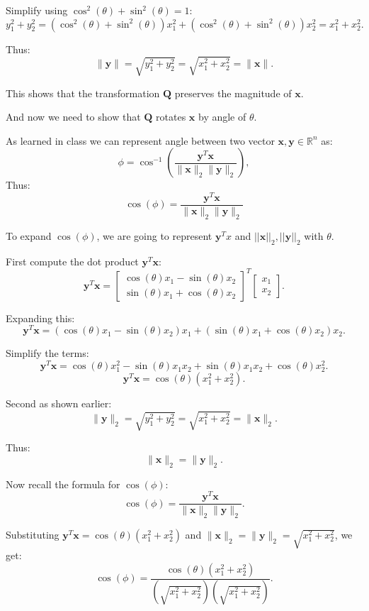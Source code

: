 \documentclass[12pt]{article}
\newcommand{\bvec}[1]{\mathbf{#1}} %
\newcommand{\bmat}[1]{\mathbf{#1}} %
\begin{document}
Simplify using \( \cos^2(\theta) + \sin^2(\theta) = 1 \):
\[
y_1^2 + y_2^2 = (\cos^2(\theta) + \sin^2(\theta))x_1^2 + (\cos^2(\theta) + \sin^2(\theta))x_2^2 = x_1^2 + x_2^2.
\]

Thus:
\[
\|\bvec{y}\| = \sqrt{y_1^2 + y_2^2} = \sqrt{x_1^2 + x_2^2} = \|\bvec{x}\|.
\]

This shows that the transformation \( \bmat{Q} \) preserves the magnitude of \( \bvec{x} \).

\vspace{\baselineskip}
And now we need to show that $\bmat{Q}$ rotates $\bvec{x}$ by angle of $\theta$.

As learned in class we can represent angle between two vector $\bmat{x},\bmat{y} \in \mathbb{R}^n$ as:
\[
\phi= \cos^{-1}\left( \frac{\bmat{y}^T \bmat{x}}{\|\bmat{x}\|_2 \|\bmat{y}\|_2}\right),
\]
Thus:
\[
\cos(\phi) = \frac{\bmat{y}^T \bmat{x}}{\|\bmat{x}\|_2 \|\bmat{y}\|_2}
\]

\vspace{\baselineskip}
To expand $\cos(\phi)$, we are going to represent $\bmat{y}^Tx$ and $||\bmat{x}||_2, ||\bmat{y}||_2$ with $\theta$.

First compute the dot product \( \bmat{y}^T \bmat{x} \):
\[
\bmat{y}^T \bmat{x} = 
\begin{bmatrix}
\cos(\theta)x_1 - \sin(\theta)x_2 \\
\sin(\theta)x_1 + \cos(\theta)x_2
\end{bmatrix}^T
\begin{bmatrix}
x_1 \\
x_2
\end{bmatrix}.
\]

Expanding this:
\[
\bmat{y}^T \bmat{x} = (\cos(\theta)x_1 - \sin(\theta)x_2)x_1 + (\sin(\theta)x_1 + \cos(\theta)x_2)x_2.
\]

Simplify the terms:
\[
\bmat{y}^T \bmat{x}= \cos(\theta)x_1^2 - \sin(\theta)x_1x_2 + \sin(\theta)x_1x_2 + \cos(\theta)x_2^2.
\]
\[
\bmat{y}^T \bmat{x} = \cos(\theta)(x_1^2 + x_2^2).
\]

Second as shown earlier:
\[
\|\bmat{y}\|_2 = \sqrt{y_1^2 + y_2^2} = \sqrt{x_1^2 + x_2^2} = \|\bmat{x}\|_2.
\]

Thus:
\[
\|\bmat{x}\|_2 = \|\bmat{y}\|_2.
\]


Now recall the formula for \( \cos(\phi) \):
\[
\cos(\phi) = \frac{\bmat{y}^T \bmat{x}}{\|\bmat{x}\|_2 \|\bmat{y}\|_2}.
\]

Substituting \( \bmat{y}^T \bmat{x} = \cos(\theta)(x_1^2 + x_2^2) \) and \( \|\bmat{x}\|_2 = \|\bmat{y}\|_2 = \sqrt{x_1^2 + x_2^2} \), we get:
\[
\cos(\phi) = \frac{\cos(\theta)(x_1^2 + x_2^2)}{(\sqrt{x_1^2 + x_2^2})(\sqrt{x_1^2 + x_2^2})}.
\]
\end{document}
